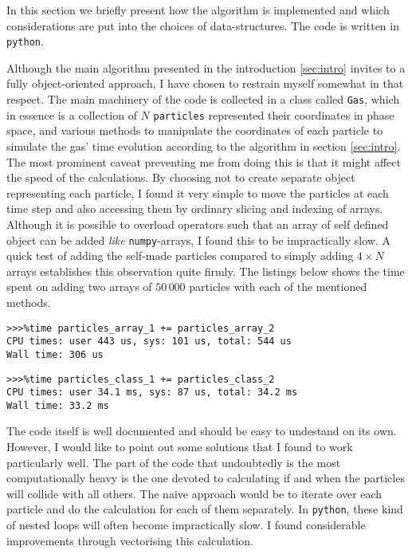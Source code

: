 In this section we briefly present how the algorithm is implemented and which considerations are put into the choices of data-structures. The code is written in \texttt{python}.

Although the main algorithm presented in the introduction \ref{sec:intro} invites to a fully object-oriented approach, I have chosen to restrain myself somewhat in that respect. 
The main machinery of the code is collected in a class called \texttt{Gas}, which in essence is a collection of $N$ \texttt{particles} represented their coordinates in phase space, and various methods to manipulate the coordinates of each particle to simulate the gas' time evolution according to the algorithm in section \ref{sec:intro}. 
The most prominent caveat preventing me from doing this is that it might affect the speed of the calculations.
By choosing not to create separate object representing each particle, I found it very simple to move the particles at each time step and also accessing them by ordinary slicing and indexing of arrays. 
Although it is possible to overload operators such that an array of self defined object can be added \textit{like} \texttt{numpy}-arrays, I found this to be impractically slow. 
A quick test of adding the self-made particles compared to simply adding $4\times N$ arrays establishes this observation quite firmly. The listings below shows the time spent on adding two arrays of $50\,000$ particles with each of the mentioned methods.

\begin{lstlisting}
>>>%time particles_array_1 += particles_array_2
CPU times: user 443 us, sys: 101 us, total: 544 us
Wall time: 306 us
\end{lstlisting}

\begin{lstlisting}
>>>%time particles_class_1 += particles_class_2
CPU times: user 34.1 ms, sys: 87 us, total: 34.2 ms
Wall time: 33.2 ms
\end{lstlisting}

The code itself is well documented and should be easy to undestand on its own. However, I would like to point out some solutions that I found to work particularly well. The part of the code that undoubtedly is the most computationally heavy is the one devoted to calculating if and when the particles will collide with all others. The naive approach would be to iterate over each particle and do the calculation for each of them separately. In \texttt{python}, these kind of nested loops will often become impractically slow. I found considerable improvements through vectorising this calculation. 


